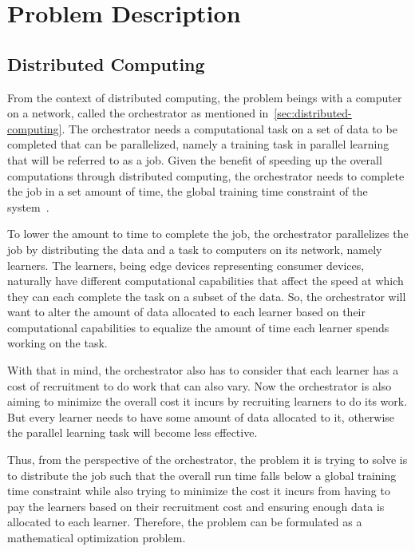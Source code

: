 \documentclass[../mthe-493-final-project.tex]{subfiles}
\begin{document}
    \chapter{Problem Description}
    \label{ch:problem-description}
    
    \section{Distributed Computing}
    \label{sec:distributed-computing-problem-description}

    From the context of distributed computing, the problem beings with a computer on a network, called the orchestrator as mentioned in~\autoref{sec:distributed-computing}. The orchestrator needs a computational task on a set of data to be completed that can be parallelized, namely a training task in parallel learning that will be referred to as a job. Given the benefit of speeding up the overall computations through distributed computing, the orchestrator needs to complete the job in a set amount of time, the global training time constraint of the system~\cite{yaqub_optimal_2020}.

    To lower the amount to time to complete the job, the orchestrator parallelizes the job by distributing the data and a task to computers on its network, namely learners. The learners, being edge devices representing consumer devices, naturally have different computational capabilities that affect the speed at which they can each complete the task on a subset of the data. So, the orchestrator will want to alter the amount of data allocated to each learner based on their computational capabilities to equalize the amount of time each learner spends working on the task.
    
    With that in mind, the orchestrator also has to consider that each learner has a cost of recruitment to do work that can also vary. Now the orchestrator is also aiming to minimize the overall cost it incurs by recruiting learners to do its work. But every learner needs to have some amount of data allocated to it, otherwise the parallel learning task will become less effective.

    Thus, from the perspective of the orchestrator, the problem it is trying to solve is to distribute the job such that the overall run time falls below a global training time constraint while also trying to minimize the cost it incurs from having to pay the learners based on their recruitment cost and ensuring enough data is allocated to each learner. Therefore, the problem can be formulated as a mathematical optimization problem.
\end{document}
